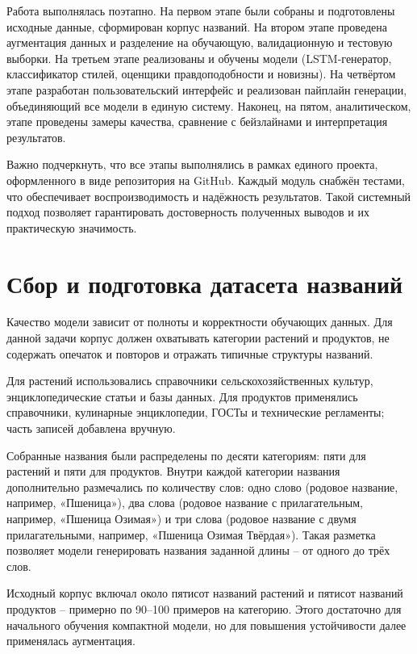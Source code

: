 Работа выполнялась поэтапно. На первом этапе были собраны и подготовлены исходные данные, сформирован корпус названий. На втором этапе проведена аугментация данных и разделение на обучающую, валидационную и тестовую выборки. На третьем этапе реализованы и обучены модели (LSTM-генератор, классификатор стилей, оценщики правдоподобности и новизны). На четвёртом этапе разработан пользовательский интерфейс и реализован пайплайн генерации, объединяющий все модели в единую систему. Наконец, на пятом, аналитическом, этапе проведены замеры качества, сравнение с бейзлайнами и интерпретация результатов.

Важно подчеркнуть, что все этапы выполнялись в рамках единого проекта, оформленного в виде репозитория на GitHub. Каждый модуль снабжён тестами, что обеспечивает воспроизводимость и надёжность результатов. Такой системный подход позволяет гарантировать достоверность полученных выводов и их практическую значимость.

\section{Сбор и подготовка датасета названий}\label{ux441ux431ux43eux440-ux438-ux43fux43eux434ux433ux43eux442ux43eux432ux43aux430-ux434ux430ux442ux430ux441ux435ux442ux430-ux43dux430ux437ux432ux430ux43dux438ux439}

Качество модели зависит от полноты и корректности обучающих данных. Для данной задачи корпус должен охватывать категории растений и продуктов, не содержать опечаток и повторов и отражать типичные структуры названий.

Для растений использовались справочники сельскохозяйственных культур, энциклопедические статьи и базы данных. Для продуктов применялись справочники, кулинарные энциклопедии, ГОСТы и технические регламенты; часть записей добавлена вручную.

Собранные названия были распределены по десяти категориям: пяти для растений и пяти для продуктов. Внутри каждой категории названия дополнительно размечались по количеству слов: одно слово (родовое название, например, «Пшеница»), два слова (родовое название с прилагательным, например, «Пшеница Озимая») и три слова (родовое название с двумя прилагательными, например, «Пшеница Озимая Твёрдая»). Такая разметка позволяет модели генерировать названия заданной длины -- от одного до трёх слов.

Исходный корпус включал около пятисот названий растений и пятисот названий продуктов -- примерно по 90--100 примеров на категорию. Этого достаточно для начального обучения компактной модели, но для повышения устойчивости далее применялась аугментация.

